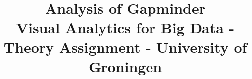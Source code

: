 \documentclass[conference]{IEEEtran}
\begin{document}
\title{
    Analysis of Gapminder\\
    \large 	Visual Analytics for Big Data - Theory Assignment - University of Groningen
}

\author{
}

\maketitle


\acresetall

% 






% 
% 
\end{document}
